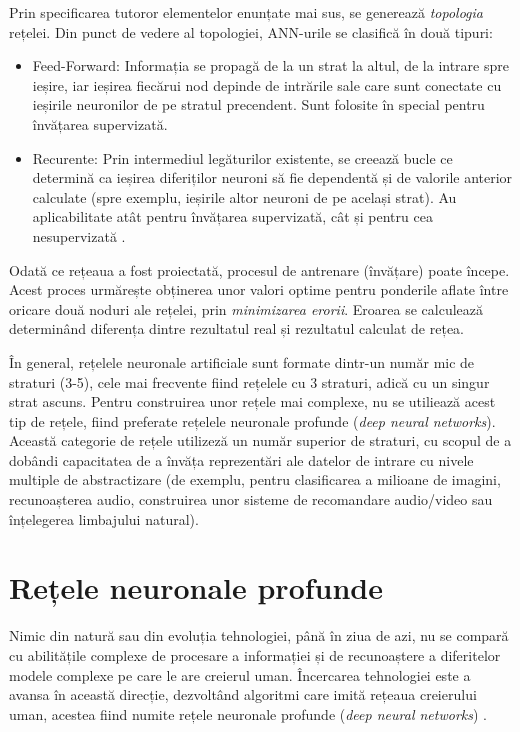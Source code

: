 \documentclass[a4paper,12pt]{report}
\begin{document}
Prin specificarea tutoror elementelor enunțate mai sus, se generează \emph{topologia} rețelei. Din punct
de vedere al topologiei, ANN-urile se clasifică în două tipuri:
\begin{itemize}
    \item Feed-Forward: Informația se propagă de la un strat la altul, de la intrare spre ieșire,
iar ieșirea fiecărui nod depinde de intrările sale care sunt conectate cu ieșirile neuronilor de pe 
stratul precendent. Sunt folosite în special pentru învățarea supervizată.
    \item Recurente: Prin intermediul legăturilor existente, se creează bucle ce determină ca 
ieșirea diferiților neuroni să fie dependentă și de valorile anterior calculate (spre exemplu, 
ieșirile altor neuroni de pe același strat). Au aplicabilitate atât pentru învățarea supervizată, cât
și pentru cea nesupervizată \cite{Tehnici-de-inteligență-computațională-Aplicații-în-electronică-și-biomedicină}.
\end{itemize}

Odată ce rețeaua a fost proiectată, procesul de antrenare (învățare) poate începe. Acest proces
urmărește obținerea unor valori optime pentru ponderile aflate între oricare două noduri ale 
rețelei, prin \emph{minimizarea erorii}. Eroarea se calculează determinând diferența dintre
rezultatul real și rezultatul calculat de rețea.

În general, rețelele neuronale artificiale sunt formate dintr-un număr mic de straturi (3-5),
cele mai frecvente fiind rețelele cu 3 straturi, adică cu un singur strat ascuns. Pentru 
construirea unor rețele mai complexe, nu se utiliează acest tip de rețele, fiind preferate
rețelele neuronale profunde (\emph{deep neural networks}). Această categorie de rețele 
utilizeză un număr superior de straturi, cu scopul de a dobândi capacitatea de a învăța 
reprezentări ale datelor de intrare cu nivele multiple de abstractizare (de exemplu, 
pentru clasificarea a milioane de imagini, recunoașterea audio, construirea unor
sisteme de recomandare audio/video sau înțelegerea limbajului natural).

\newpage
\section{Rețele neuronale profunde}
Nimic din natură sau din evoluția tehnologiei, până în ziua de azi, nu se compară cu abilitățile
complexe de procesare a informației și de recunoaștere a diferitelor modele complexe pe care 
le are creierul uman. Încercarea tehnologiei este a avansa în această direcție, dezvoltând 
algoritmi care imită rețeaua creierului uman, acestea fiind numite rețele neuronale profunde 
(\emph{deep neural networks}) \cite{WEBSITE:cnn-for-visual-recognition}.
\end{document}
